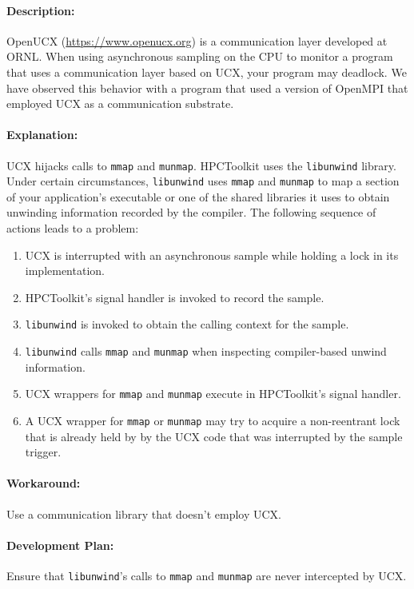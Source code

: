 \documentclass[11pt,letterpaper]{report}
\begin{document}
\paragraph{Description:}
OpenUCX (\url{https://www.openucx.org}) is a communication layer developed at ORNL. When using asynchronous sampling on the CPU to monitor a program that uses a communication layer based on UCX, your program may deadlock. We have observed this behavior with a program that used a version of OpenMPI that employed UCX as a communication substrate.

\paragraph{Explanation:} UCX hijacks calls to \verb|mmap| and \verb|munmap|.
HPCToolkit uses the \verb|libunwind| library.
Under certain circumstances, \verb|libunwind| uses \verb|mmap| and \verb|munmap| to map a section of your application's executable or one of the shared libraries it uses to obtain unwinding information recorded by the compiler.
The following sequence of actions leads to a problem:
\begin{enumerate}
\item
UCX is interrupted with an asynchronous sample while holding a lock in its implementation.
\item
HPCToolkit's signal handler is invoked to record the sample.
\item
\verb|libunwind| is invoked to obtain the calling context for the sample.
\item
\verb|libunwind|  calls \verb|mmap| and \verb|munmap|
when inspecting compiler-based unwind information.
\item
UCX wrappers for \verb|mmap| and \verb|munmap|  execute in HPCToolkit's signal handler.
\item
A UCX wrapper for \verb|mmap| or \verb|munmap| may try to acquire a non-reentrant lock that is already held by
by the UCX code that was interrupted by the sample trigger.
\end{enumerate}

\paragraph{Workaround:} Use a communication library that doesn't employ UCX.


\paragraph{Development Plan:} Ensure that \verb|libunwind|'s calls to \verb|mmap| and \verb|munmap| are never intercepted by UCX.
\end{document}
